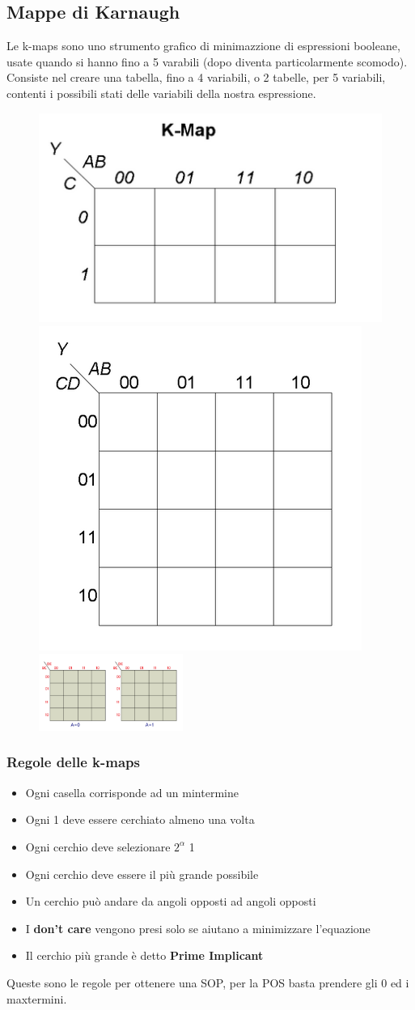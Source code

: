 \documentclass{report}
\begin{document}
    \subsection{Mappe di Karnaugh}
        Le k-maps sono uno strumento grafico di minimazzione di espressioni booleane, 
        usate quando si hanno fino a 5 varabili (dopo diventa particolarmente scomodo). \\
        Consiste nel creare una tabella, fino a 4 variabili, o 2 tabelle, per 5 variabili,
        contenti i possibili stati delle variabili della nostra espressione.
        \begin{center}
                \begin{figure}[H]
                    \includegraphics[width=.3\textwidth]{k1.png}\hfill
                    \includegraphics[width=.3\textwidth]{k2.png}\hfill
                    \includegraphics[width=.3\textwidth, height = 2.5cm]{k3.png}
                \end{figure}
        \end{center}
        \subsubsection{Regole delle k-maps}
        \begin{itemize}
            \item Ogni casella corrisponde ad un mintermine
            \item Ogni 1 deve essere cerchiato almeno una volta
            \item Ogni cerchio deve selezionare $2^\alpha$ 1
            \item Ogni cerchio deve essere il più grande possibile
            \item Un cerchio può andare da angoli opposti ad angoli opposti
            \item I \textbf{don't care} vengono presi solo se aiutano a minimizzare l'equazione
            \item Il cerchio più grande è detto \textbf{Prime Implicant}
        \end{itemize}
            Queste sono le regole per ottenere una SOP, per la POS basta prendere gli 0 ed i maxtermini.
\end{document}
